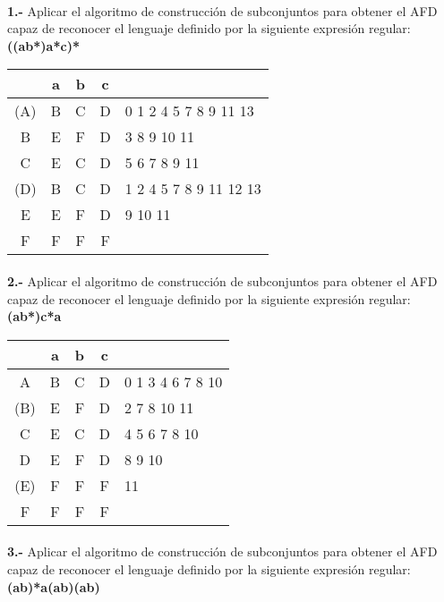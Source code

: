 \documentclass[11pt,a4paper]{report}
\begin{document}
\paragraph{}

\paragraph{}
\textbf{1.-} Aplicar el algoritmo de construcción de subconjuntos para obtener el AFD capaz de reconocer el lenguaje definido por la siguiente expresión regular: \textbf{((a\textbar b*)a*c)*} \\

\begin{tabular} {| c | c |c |c | l |}
\hline 
& a & b & c & \\ \hline
(A) & B & C & D & 0 1 2 4 5 7 8 9 11 13 \\ \hline
B & E & F & D & 3 8 9 10 11 \\ \hline
C & E & C & D & 5 6 7 8 9 11 \\ \hline
(D) & B & C & D & 1 2 4 5 7 8 9 11 12 13 \\ \hline
E & E & F & D & 9 10 11 \\ \hline
F & F & F & F & \\ \hline
\end{tabular}\paragraph{}
\textbf{2.-} Aplicar el algoritmo de construcción de subconjuntos para obtener el AFD capaz de reconocer el lenguaje definido por la siguiente expresión regular: \textbf{(a\textbar b*)c*a} \\

\begin{tabular} {| c | c |c |c | l |}
\hline 
& a & b & c & \\ \hline
A & B & C & D & 0 1 3 4 6 7 8 10 \\ \hline
(B) & E & F & D & 2 7 8 10 11 \\ \hline
C & E & C & D & 4 5 6 7 8 10 \\ \hline
D & E & F & D & 8 9 10 \\ \hline
(E) & F & F & F & 11 \\ \hline
F & F & F & F & \\ \hline
\end{tabular}\paragraph{}
\textbf{3.-} Aplicar el algoritmo de construcción de subconjuntos para obtener el AFD capaz de reconocer el lenguaje definido por la siguiente expresión regular: \textbf{(a\textbar b)*a(a\textbar b)(a\textbar b)} \\
\end{document}
